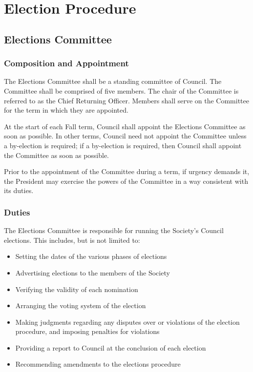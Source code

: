 \section{Election Procedure}
\subsection{Elections Committee}
\subsubsection{Composition and Appointment}
The Elections Committee shall be a standing committee of Council. The
Committee shall be comprised of five members. The chair of the Committee is
referred to as the Chief Returning Officer. Members shall serve on the Committee
for the term in which they are appointed.

At the start of each Fall term, Council shall appoint the Elections Committee as
soon as possible. In other terms, Council need not appoint the Committee unless
a by-election is required; if a by-election is required, then Council shall
appoint the Committee as soon as possible.

Prior to the appointment of the Committee during a term, if urgency demands it,
the President may exercise the powers of the Committee in a way consistent with
its duties.

\subsubsection{Duties}
The Elections Committee is responsible for running the Society's Council
elections. This includes, but is not limited to:
\begin{itemize}
\item Setting the dates of the various phases of elections
\item Advertising elections to the members of the Society
\item Verifying the validity of each nomination
\item Arranging the voting system of the election
\item Making judgments regarding any disputes over or violations of the election
procedure, and imposing penalties for violations
\item Providing a report to Council at the conclusion of each election
\item Recommending amendments to the elections procedure
\end{itemize}

